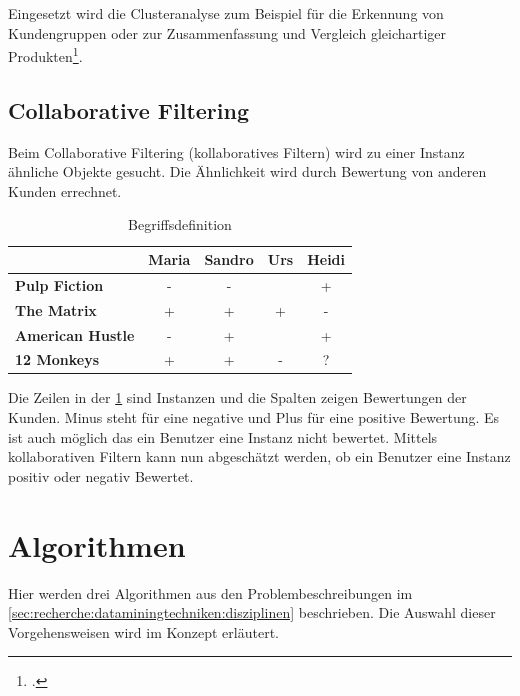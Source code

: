 Eingesetzt wird die Clusteranalyse zum Beispiel für die Erkennung von Kundengruppen oder zur  Zusammenfassung und Vergleich gleichartiger Produkten\footcite{einsatzgebiet_clusteranalyse}.


\subsection{Collaborative Filtering}
\label{sec:recherche:dataminingtechniken:disziplinen:collaborativefiltering}
Beim Collaborative Filtering (kollaboratives Filtern) wird zu einer Instanz ähnliche Objekte gesucht. Die Ähnlichkeit wird durch Bewertung von anderen Kunden errechnet. 


\begin{table}[H] 
	\caption{Begriffsdefinition}
	\centering
	\label{fig:recherche:dataminingtechniken:disziplinen:collaborativefiltering}
	
	\begin{tabular}{ | l | c | c | c | c |} 
		\hline 
		\rowcolor{tableheadcolor}
		\bfseries & 
		\bfseries Maria & 
		\bfseries Sandro & 
		\bfseries Urs & 
		\bfseries Heidi \\ \hline 
		\textbf{Pulp Fiction} & - & - &  & + \\ \hline 
		\textbf{The Matrix} & + & + & + & - \\ \hline 
		\textbf{American Hustle} & - & + &  & + \\ \hline 
		\textbf{12 Monkeys} & + & + & - & \cellcolor{yellow!75}? \\ \hline 
	\end{tabular} 
\end{table}

Die Zeilen in der \cref{fig:recherche:dataminingtechniken:disziplinen:collaborativefiltering} sind Instanzen und die Spalten zeigen Bewertungen der Kunden. Minus steht für eine negative und Plus für eine positive Bewertung. Es ist auch möglich das ein Benutzer eine Instanz nicht bewertet. Mittels kollaborativen Filtern kann nun abgeschätzt werden, ob ein Benutzer eine Instanz positiv oder negativ Bewertet.

\section{Algorithmen}
\label{sec:recherche:algorithmen}
Hier werden drei Algorithmen aus den Problembeschreibungen im \cref{sec:recherche:dataminingtechniken:disziplinen}  beschrieben. Die Auswahl dieser Vorgehensweisen wird im Konzept erläutert.

